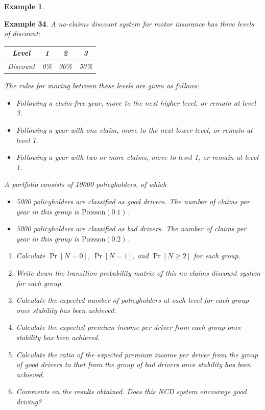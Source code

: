 \documentclass[
]{book}
\theoremstyle{definition}
\theoremstyle{definition}
\newtheorem{example}{Example}[chapter]
\theoremstyle{definition}
\theoremstyle{definition}
\theoremstyle{remark}
\begin{document}
\begin{example}
\protect\hypertarget{exm:unlabeled-div-36}{}\label{exm:unlabeled-div-36}

\textbf{Example 34}. \emph{A no-claims discount system for motor insurance has
three levels of discount:}

\begin{longtable}[]{@{}cccc@{}}
\toprule
\emph{Level} & \emph{1} & \emph{2} & \emph{3} \\
\midrule
\endhead
\emph{Discount} & \emph{0\%} & \emph{30\%} & \emph{50\%} \\
\bottomrule
\end{longtable}

\emph{The rules for moving between these levels are given as follows:}

\begin{itemize}
\item
  \emph{Following a claim-free year, move to the next higher level, or
  remain at level 3.}
\item
  \emph{Following a year with one claim, move to the next lower level, or
  remain at level 1.}
\item
  \emph{Following a year with two or more claims, move to level 1, or
  remain at level 1.}
\end{itemize}

\emph{A portfolio consists of 10000 policyholders, of which}

\begin{itemize}
\item
  \emph{5000 policyholders are classified as good drivers. The number of
  claims per year in this group is \(\text{Poisson}(0.1)\).}
\item
  \emph{5000 policyholders are classified as bad drivers. The number of
  claims per year in this group is \(\text{Poisson}(0.2)\).}
\end{itemize}

\begin{enumerate}
\def\labelenumi{\arabic{enumi}.}
\item
  \emph{Calculate \(\Pr[N = 0]\), \(\Pr[N = 1]\), and \(\Pr[N \ge 2]\) for each
  group.}
\item
  \emph{Write down the transition probability matrix of this no-claims
  discount system for each group.}
\item
  \emph{Calculate the expected number of policyholders at each level for
  each group once stability has been achieved.}
\item
  \emph{Calculate the expected premium income per driver from each group
  once stability has been achieved.}
\item
  \emph{Calculate the ratio of the expected premium income per driver from
  the group of good drivers to that from the group of bad drivers once
  stability has been achieved.}
\item
  \emph{Comments on the results obtained. Does this NCD system encourage
  good driving?}
\end{enumerate}

\end{example}
\end{document}
